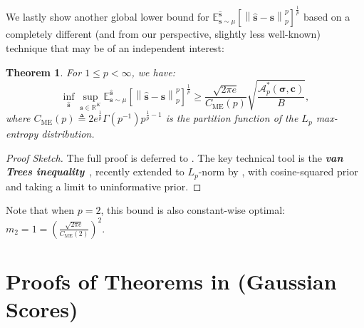 \documentclass{article}
\def\vc{{\bm{c}}}
\def\vs{{\bm{s}}}
\def\gA{{\mathcal{A}}}
\def\sR{{\mathbb{R}}}
\newcommand{\E}{\mathbb{E}}
\theoremstyle{plain}
\newtheorem{theorem}{Theorem}[section]
\theoremstyle{definition}
\theoremstyle{plain}
\newcommand{\bignorm}[1]{\left\lVert #1 \right\rVert}
\begin{document}
We lastly show another global lower bound for $\E^{\hat{\vs}}_{\vs \sim \mu}\left[ \bignorm{\hat{\vs} - \vs}_p^p \right]^{\frac{1}{p}}$ based on a completely different (and from our perspective, slightly less well-known) technique that may be of an independent interest:
\begin{theorem}
\label{thm:lower-bound-van-trees}
    For $1 \leq p < \infty$, we have:
    \begin{equation}
        \inf_{\hat{\vs}} \sup_{\vs \in \sR^K} \E^{\hat{\vs}}_{\vs \sim \mu}\left[ \bignorm{\hat{\vs} - \vs}_p^p \right]^{\frac{1}{p}} \geq \frac{\sqrt{2 \pi e}}{C_{\mathrm{ME}}(p)}  \sqrt{\frac{\gA_p^*(\bm\sigma, \vc)}{B}},
    \end{equation}
    where $C_{\mathrm{ME}}(p) \triangleq 2 e^{\frac{1}{p}} \Gamma(p^{-1}) p^{\frac{1}{p} - 1}$ is the partition function of the $L_p$ max-entropy distribution.
\end{theorem}
\begin{proof}[Proof Sketch]
    The full proof is deferred to .
    The key technical tool is the \textbf{\textit{van Trees inequality}}~\citep{vanTrees,gill-levit}, recently extended to $L_p$-norm by \citet{chen2024vantrees}, with cosine-squared prior~\citep{tsybakov} and taking a limit to uninformative prior.
\end{proof}

Note that when $p = 2$, this bound is also constant-wise optimal: $m_2 = 1 = \left( \frac{\sqrt{2 \pi e}}{C_{\mathrm{ME}}(2)} \right)^2$.





\newpage
\section{\texorpdfstring{Proofs of Theorems in  (Gaussian Scores)}{Proofs of Theorems in Appendix F (Gaussian Scores)}}\label{app:gaussian-proof}
\end{document}
